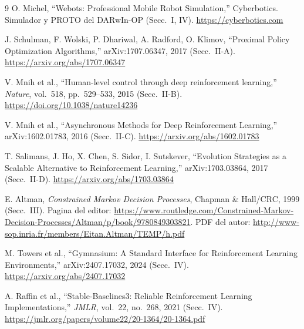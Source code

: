 \documentclass[conference]{IEEEtran}
\begin{document}
\begin{thebibliography}{9}
 O. Michel, ``Webots: Professional Mobile Robot Simulation,''
Cyberbotics. Simulador y PROTO del DARwIn-OP (Secc.\ I, IV).
\url{https://cyberbotics.com}

 J. Schulman, F. Wolski, P. Dhariwal, A. Radford, O. Klimov,
``Proximal Policy Optimization Algorithms,'' arXiv:1707.06347, 2017 (Secc.\ II-A).
\url{https://arxiv.org/abs/1707.06347}

 V. Mnih et al., ``Human-level control through deep reinforcement
learning,'' \emph{Nature}, vol.\ 518, pp.\ 529--533, 2015 (Secc.\ II-B).
\url{https://doi.org/10.1038/nature14236}

 V. Mnih et al., ``Asynchronous Methods for Deep Reinforcement
Learning,'' arXiv:1602.01783, 2016 (Secc.\ II-C).
\url{https://arxiv.org/abs/1602.01783}

 T. Salimans, J. Ho, X. Chen, S. Sidor, I. Sutskever, ``Evolution
Strategies as a Scalable Alternative to Reinforcement Learning,''
arXiv:1703.03864, 2017 (Secc.\ II-D).
\url{https://arxiv.org/abs/1703.03864}

 E. Altman, \emph{Constrained Markov Decision Processes}, Chapman
\& Hall/CRC, 1999 (Secc.\ III). Pagina del editor:
\url{https://www.routledge.com/Constrained-Markov-Decision-Processes/Altman/p/book/9780849303821}.
PDF del autor: \url{http://www-sop.inria.fr/members/Eitan.Altman/TEMP/h.pdf}

 M. Towers et al., ``Gymnasium: A Standard Interface for
Reinforcement Learning Environments,'' arXiv:2407.17032, 2024 (Secc.\ IV).
\url{https://arxiv.org/abs/2407.17032}

 A. Raffin et al., ``Stable-Baselines3: Reliable Reinforcement
Learning Implementations,'' \emph{JMLR}, vol.\ 22, no.\ 268, 2021 (Secc.\ IV).
\url{https://jmlr.org/papers/volume22/20-1364/20-1364.pdf}
\end{thebibliography}
\end{document}
